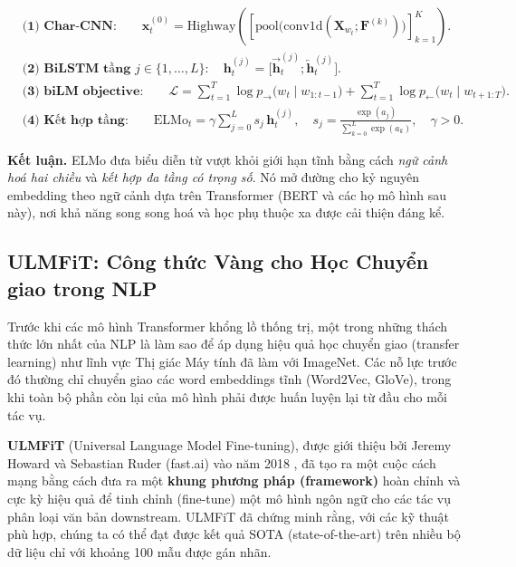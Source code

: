 \begin{align*}
  &\textbf{(1) Char-CNN:}\qquad 
  \mathbf{x}_t^{(0)} = \mathrm{Highway}\!\left(\left[\mathrm{pool}\big(\mathrm{conv1d}(\mathbf{X}_{w_t}; \mathbf{F}^{(k)})\big)\right]_{k=1}^{K}\right).\\[4pt]
  &\textbf{(2) BiLSTM tầng } j\in\{1,\dots,L\}:\quad
  \mathbf{h}_t^{(j)} = \big[\overrightarrow{\mathbf{h}}_{t}^{(j)} ; \overleftarrow{\mathbf{h}}_{t}^{(j)}\big].\\[4pt]
  &\textbf{(3) biLM objective:}\qquad
  \mathcal{L} = \sum_{t=1}^{T} \log p_{\rightarrow}\big(w_t \mid w_{1:t-1}\big) 
  + \sum_{t=1}^{T} \log p_{\leftarrow}\big(w_t \mid w_{t+1:T}\big).\\[4pt]
  &\textbf{(4) Kết hợp tầng:}\qquad
  \text{ELMo}_t = \gamma \sum_{j=0}^{L} s_j\, \mathbf{h}_t^{(j)}, 
  \quad s_j = \frac{\exp(a_j)}{\sum_{k=0}^{L}\exp(a_k)},\quad \gamma>0.
\end{align*}

\vspace{4pt}
\noindent\textbf{Kết luận.} ELMo đưa biểu diễn từ vượt khỏi giới hạn tĩnh bằng cách \emph{ngữ cảnh hoá hai chiều} và \emph{kết hợp đa tầng có trọng số}. Nó mở đường cho kỷ nguyên embedding theo ngữ cảnh dựa trên Transformer (BERT và các họ mô hình sau này), nơi khả năng song song hoá và học phụ thuộc xa được cải thiện đáng kể.

\subsection{ULMFiT: Công thức Vàng cho Học Chuyển giao trong NLP}
\label{ssec:ulmfit}

Trước khi các mô hình Transformer khổng lồ thống trị, một trong những thách thức lớn nhất của NLP là làm sao để áp dụng hiệu quả học chuyển giao (transfer learning) như lĩnh vực Thị giác Máy tính đã làm với ImageNet. Các nỗ lực trước đó thường chỉ chuyển giao các word embeddings tĩnh (Word2Vec, GloVe), trong khi toàn bộ phần còn lại của mô hình phải được huấn luyện lại từ đầu cho mỗi tác vụ.

\textbf{ULMFiT} (Universal Language Model Fine-tuning), được giới thiệu bởi Jeremy Howard và Sebastian Ruder (fast.ai) vào năm 2018 \cite{howard2018universal}, đã tạo ra một cuộc cách mạng bằng cách đưa ra một \textbf{khung phương pháp (framework)} hoàn chỉnh và cực kỳ hiệu quả để tinh chỉnh (fine-tune) một mô hình ngôn ngữ cho các tác vụ phân loại văn bản downstream. ULMFiT đã chứng minh rằng, với các kỹ thuật phù hợp, chúng ta có thể đạt được kết quả SOTA (state-of-the-art) trên nhiều bộ dữ liệu chỉ với khoảng 100 mẫu được gán nhãn.

